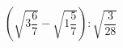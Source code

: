 \begin{ex}[type=calculate]
	\begin{condition}
		\( \left( \sqrt{3\dfrac{6}{7}}-\sqrt{1\dfrac{5}{7}} \right):\sqrt{\dfrac{3}{28}} \)
	\end{condition}
\end{ex}